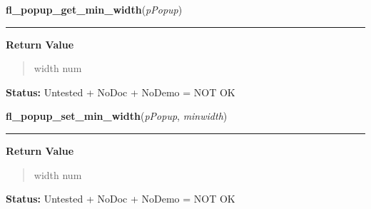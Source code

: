     \label{xformslib:library:fl_popup_get_min_width}

    \vspace{0.5ex}

\hspace{.8\funcindent}\begin{boxedminipage}{\funcwidth}

    \raggedright \textbf{fl\_popup\_get\_min\_width}(\textit{pPopup})

    \vspace{-1.5ex}

    \rule{\textwidth}{0.5\fboxrule}
\setlength{\parskip}{2ex}
\setlength{\parskip}{1ex}
      \textbf{Return Value}
    \vspace{-1ex}

      \begin{quote}
      width num

      \end{quote}

\textbf{Status:} Untested + NoDoc + NoDemo = NOT OK



    \end{boxedminipage}

    \label{xformslib:library:fl_popup_set_min_width}

    \vspace{0.5ex}

\hspace{.8\funcindent}\begin{boxedminipage}{\funcwidth}

    \raggedright \textbf{fl\_popup\_set\_min\_width}(\textit{pPopup}, \textit{minwidth})

    \vspace{-1.5ex}

    \rule{\textwidth}{0.5\fboxrule}
\setlength{\parskip}{2ex}
\setlength{\parskip}{1ex}
      \textbf{Return Value}
    \vspace{-1ex}

      \begin{quote}
      width num

      \end{quote}

\textbf{Status:} Untested + NoDoc + NoDemo = NOT OK



    \end{boxedminipage}

